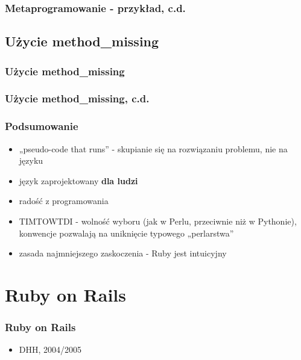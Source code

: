 \documentclass[12t]{beamer}
\begin{document}
\begin{frame}[fragile]
  \frametitle{Metaprogramowanie - przykład, c.d.}
  
\end{frame}

\subsection{Użycie method\_missing}
\begin{frame}[fragile]
  \frametitle{Użycie method\_missing}
  
\end{frame}

\begin{frame}[fragile]
  \frametitle{Użycie method\_missing, c.d.}
  
\end{frame}

\begin{frame}
  \frametitle{Podsumowanie}
  \begin{itemize}
  \item „pseudo-code that runs” - skupianie się na rozwiązaniu
    problemu, nie na języku
  \item język zaprojektowany \textbf{dla ludzi}
  \item radość z programowania
  \item TIMTOWTDI - wolność wyboru (jak w Perlu, przeciwnie niż w
    Pythonie), konwencje pozwalają na uniknięcie typowego „perlarstwa”
  \item zasada najmniejszego zaskoczenia - Ruby jest intuicyjny
  \end{itemize}
\end{frame}

\section{Ruby on Rails}
\begin{frame}
  \frametitle{Ruby on Rails}
  \begin{itemize}
  \item DHH, 2004/2005
  \end{itemize}
\end{frame}
\end{document}
